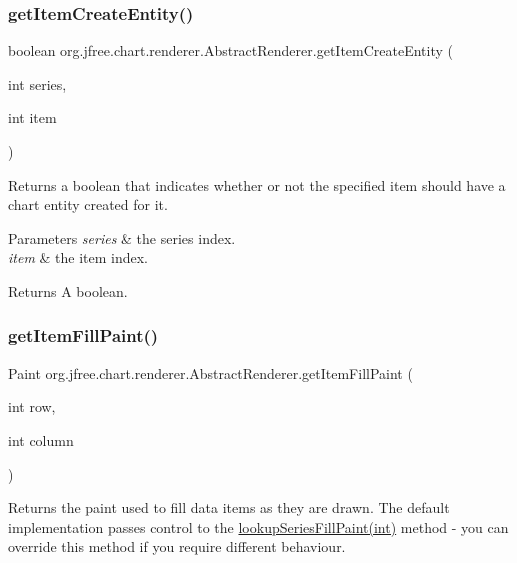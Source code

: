 \subsubsection{\texorpdfstring{get\+Item\+Create\+Entity()}{getItemCreateEntity()}}
{\footnotesize\ttfamily boolean org.\+jfree.\+chart.\+renderer.\+Abstract\+Renderer.\+get\+Item\+Create\+Entity (\begin{DoxyParamCaption}\item[{int}]{series,  }\item[{int}]{item }\end{DoxyParamCaption})}

Returns a boolean that indicates whether or not the specified item should have a chart entity created for it.


\begin{DoxyParams}{Parameters}
{\em series} & the series index. \\
\hline
{\em item} & the item index.\\
\hline
\end{DoxyParams}
\begin{DoxyReturn}{Returns}
A boolean. 
\end{DoxyReturn}
\mbox{\label{classorg_1_1jfree_1_1chart_1_1renderer_1_1_abstract_renderer_ac9da36f02e26338f740ea54c9210e60f}} 
\subsubsection{\texorpdfstring{get\+Item\+Fill\+Paint()}{getItemFillPaint()}}
{\footnotesize\ttfamily Paint org.\+jfree.\+chart.\+renderer.\+Abstract\+Renderer.\+get\+Item\+Fill\+Paint (\begin{DoxyParamCaption}\item[{int}]{row,  }\item[{int}]{column }\end{DoxyParamCaption})}

Returns the paint used to fill data items as they are drawn. The default implementation passes control to the \mbox{\hyperlink{classorg_1_1jfree_1_1chart_1_1renderer_1_1_abstract_renderer_a12a702d7b43fac8d70b5c55c03b492fc}{lookup\+Series\+Fill\+Paint(int)}} method -\/ you can override this method if you require different behaviour.


